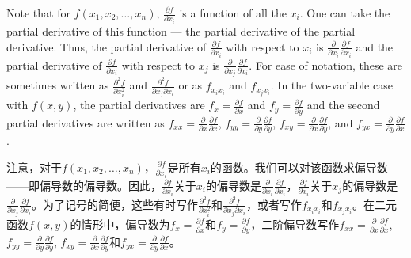 \begin{original}
Note that for $f(x_1, x_2, \dots, x_n)$, $\frac{\partial f}{\partial x_i}$ is a function of all the $x_i$. One can take the partial derivative of this function --- the partial derivative of the partial derivative. Thus, the partial derivative of $\frac{\partial f}{\partial x_i}$ with respect to $x_i$ is $\frac{\partial}{\partial x_i}\frac{\partial f}{\partial x_i}$ and the partial derivative of $\frac{\partial f}{\partial x_i}$ with respect to $x_j$ is $\frac{\partial}{\partial x_j}\frac{\partial f}{\partial x_i}$. For ease of notation, these are sometimes written as $\frac{\partial^2 f}{\partial x_i^2}$ and $\frac{\partial^2 f}{\partial x_j \partial x_i}$ or as $f_{x_i x_i}$ and $f_{x_j x_i}$. In the two-variable case with $f(x, y)$, the partial derivatives are $f_x = \frac{\partial f}{\partial x}$ and $f_y = \frac{\partial f}{\partial y}$ and the second partial derivatives are written as $f_{xx} = \frac{\partial}{\partial x}\frac{\partial f}{\partial x}$, $f_{yy} = \frac{\partial}{\partial y}\frac{\partial f}{\partial y}$, $f_{xy} = \frac{\partial}{\partial x}\frac{\partial f}{\partial y}$, and $f_{yx} = \frac{\partial}{\partial y}\frac{\partial f}{\partial x}$.
\end{original}
\begin{translation}
注意，对于$f(x_1, x_2, \dots, x_n)$，$\frac{\partial f}{\partial x_i}$是所有$x_i$的函数。我们可以对该函数求偏导数——即偏导数的偏导数。因此，$\frac{\partial f}{\partial x_i}$关于$x_i$的偏导数是$\frac{\partial}{\partial x_i}\frac{\partial f}{\partial x_i}$，$\frac{\partial f}{\partial x_i}$关于$x_j$的偏导数是$\frac{\partial}{\partial x_j}\frac{\partial f}{\partial x_i}$。为了记号的简便，这些有时写作$\frac{\partial^2 f}{\partial x_i^2}$和$\frac{\partial^2 f}{\partial x_j \partial x_i}$，或者写作$f_{x_i x_i}$和$f_{x_j x_i}$。在二元函数$f(x, y)$的情形中，偏导数为$f_x = \frac{\partial f}{\partial x}$和$f_y = \frac{\partial f}{\partial y}$，二阶偏导数写作$f_{xx} = \frac{\partial}{\partial x}\frac{\partial f}{\partial x}$, $f_{yy} = \frac{\partial}{\partial y}\frac{\partial f}{\partial y}$, $f_{xy} = \frac{\partial}{\partial x}\frac{\partial f}{\partial y}$和$f_{yx} = \frac{\partial}{\partial y}\frac{\partial f}{\partial x}$。
\end{translation}

